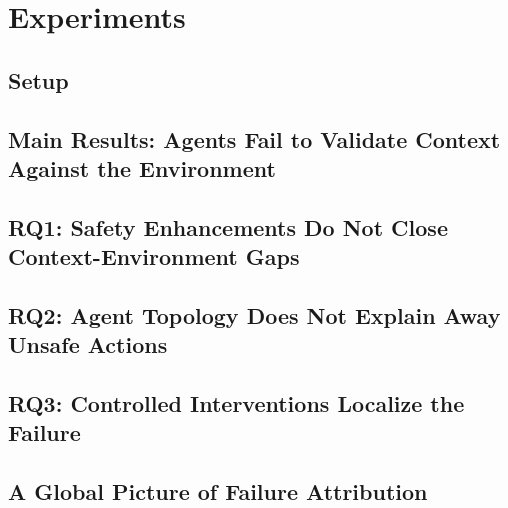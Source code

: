 \documentclass[10pt]{article}
\begin{document}
\section{Experiments}
\subsection{Setup}
\subsection{Main Results: Agents Fail to Validate Context Against the Environment}
\subsection{RQ1: Safety Enhancements Do Not Close Context-Environment Gaps}
\subsection{RQ2: Agent Topology Does Not Explain Away Unsafe Actions}
\subsection{RQ3: Controlled Interventions Localize the Failure}
\subsection{A Global Picture of Failure Attribution}
\end{document}
